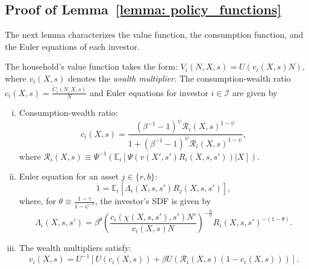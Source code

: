 \subsection{Proof of Lemma~\ref{lemma: policy_functions}} \label{app: proof_policy_functions}

The next lemma characterizes the value function, the consumption function, and the Euler equations of each investor.

\begin{lemma}\label{lemma: policy_functions}
The household's value function takes the form: 
$V_{i}(N,X,s)=U\left(v_{i}(X,s)N\right),$
where $v_{i}(X,s)$ denotes the \textit{wealth multiplier}. The consumption-wealth
ratio $c_{i}(X,s)=\frac{\tilde{C}_{i}(N,X,s)}{N}$ and Euler equations
for investor $i\in\mathcal{I}$ are given by
\begin{enumerate}[(i)]
\item Consumption-wealth ratio:
\begin{equation}
c_{i}(X,s)=\frac{(\beta^{-1}-1)^{\psi}\mathcal{R}_{i}(X,s)^{1-\psi}}{1+(\beta^{-1}-1)^{\psi}\mathcal{R}_{i}(X,s)^{1-\psi}},\label{eq: c_n}
\end{equation}
where $\mathcal{R}_{i}(X,s)\equiv\Psi^{-1}\left(\mathbb{E}_{i}\left[\Psi\left(v(X',s')R_{i}(X,s,s')\right)|X\right]\right)$.
\item Euler equation for an asset $j\in\{r,b\}$: 
\begin{equation}
1=\mathbb{E}_{i}\left[\left.\Lambda_{i}(X,s,s')R_{j}(X,s,s')\right.\right],\label{eq: eulers_app}
\end{equation}
where, for $\theta\equiv\frac{1-\gamma}{1-\psi^{-1}}$, the investor's SDF is given by 
\begin{equation}
\Lambda_{i}(X,s,s')=\beta^{\theta}\left(\frac{c_{i}(\chi(X,s,s'),s')N'}{c_{i}(X,s)N}\right)^{-\frac{\theta}{\psi}}R_{i}(X,s,s')^{-(1-\theta)}.
\end{equation}
\item The wealth multipliers satisfy:
\begin{equation}
v_{i}(X,s)=U^{-1}\left[U\left(c_{i}(X,s)\right)+\beta U\left(\mathcal{R}_{i}(X,s)\left(1-c_{i}(X,s)\right)\right)\right].\label{eq:value.recursion}
\end{equation}
\end{enumerate}
\end{lemma}
